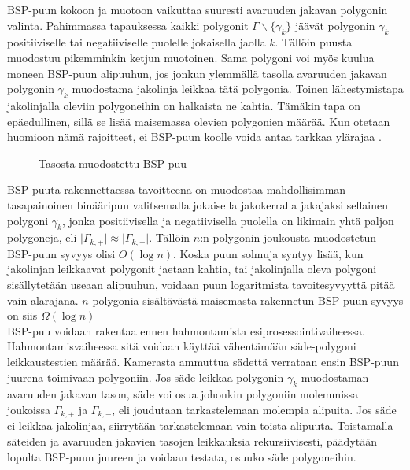 ﻿\documentclass[a4paper,12pt, titlepage]{article}
\newcommand{\abs}[1]{\vert #1 \vert} %
\begin{document}
BSP-puun kokoon ja muotoon vaikuttaa suuresti avaruuden jakavan polygonin valinta. Pahimmassa tapauksessa kaikki polygonit $\Gamma\backslash\{\gamma_k\}$ jäävät polygonin $\gamma_k$ positiiviselle tai negatiiviselle puolelle jokaisella jaolla $k$. Tällöin puusta muodostuu pikemminkin ketjun muotoinen. Sama polygoni voi myös kuulua moneen BSP-puun alipuuhun, jos jonkun ylemmällä tasolla avaruuden jakavan polygonin $\gamma_k$ muodostama jakolinja leikkaa tätä polygonia. \citep[.]{samet} Toinen lähestymistapa jakolinjalla oleviin polygoneihin on halkaista ne kahtia. Tämäkin tapa on epäedullinen, sillä se lisää maisemassa olevien polygonien määrää. \citep[.]{ranta} Kun otetaan huomioon nämä rajoitteet, ei BSP-puun koolle voida antaa tarkkaa ylärajaa \citep{hughes}.\\

\begin{figure}
 \centering
 \caption{Tasosta muodostettu BSP-puu}
 \label{bsp2}
\end{figure}


BSP-puuta rakennettaessa tavoitteena on muodostaa mahdollisimman tasapainoinen binääripuu valitsemalla jokaisella jakokerralla jakajaksi sellainen polygoni $\gamma_k$, jonka positiivisella ja negatiivisella puolella on likimain yhtä paljon polygoneja, eli $\abs{\Gamma_{k,+}} \approx \abs{\Gamma_{k,-}}$. Tällöin  $n$:n polygonin joukousta muodostetun BSP-puun syvyys olisi $O(\log n)$. Koska puun solmuja syntyy lisää, kun jakolinjan leikkaavat polygonit jaetaan kahtia, tai jakolinjalla oleva polygoni sisällytetään useaan alipuuhun, voidaan puun logaritmista tavoitesyvyyttä pitää vain alarajana. \citep[.]{hughes} $n$ polygonia sisältävästä maisemasta rakennetun BSP-puun syvyys on siis $\Omega(\log n)$\\

BSP-puu voidaan rakentaa ennen hahmontamista esiprosessointivaiheessa. Hahmontamisvaiheessa sitä voidaan käyttää vähentämään säde-polygoni leikkaustestien määrää. Kamerasta ammuttua sädettä verrataan ensin BSP-puun juurena toimivaan polygoniin. Jos säde leikkaa polygonin $\gamma_k$ muodostaman avaruuden jakavan tason, säde voi osua johonkin polygoniin molemmissa joukoissa ${\Gamma_{k,+}}$ ja ${\Gamma_{k,-}}$, eli joudutaan tarkastelemaan molempia alipuita. Jos säde ei leikkaa jakolinjaa, siirrytään tarkastelemaan vain toista alipuuta. Toistamalla säteiden ja avaruuden jakavien tasojen leikkauksia rekursiivisesti, päädytään lopulta BSP-puun juureen ja voidaan testata, osuuko säde polygoneihin.\citep{ranta}\\
\end{document}
